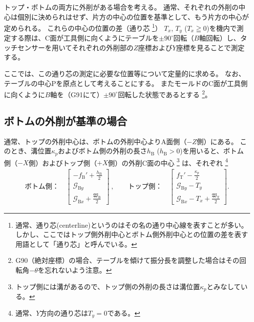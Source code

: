 \clearpage
トップ・ボトムの両方に外削がある場合を考える。
通常、それぞれの外削の中心は個別に決められはせず、片方の中心の位置を基準として、もう片方の中心が定められる。
これらの中心の位置の差（通り芯
\footnote{通常、通り芯(centerline)というのはその名の通り中心線を表すことが多い。
しかし、ここではトップ側外削中心とボトム側外削中心との位置の差を表す用語として「通り芯」と呼んでいる。}）
$T_x$, $T_y$ ($T_x \geqq 0$)を機内で測定する際は、C面が工具側に向くようにテーブルを$\pm90^\circ$回転（$B$軸回転）し、タッチセンサーを用いてそれぞれの外削部の$Z$座標および$Y$座標を見ることで測定する。

ここでは、この通り芯の測定に必要な位置等について定量的に求める。
なお、テーブルの中心Pを原点として考えることにする。
またモールドのC面が工具側に向くように$B$軸を（G91にて）$\pm90^\circ$回転した状態であるとする
\footnote{G90（絶対座標）の場合、テーブルを傾けて振分長を調整した場合はその回転角$-\theta$を忘れないよう注意。}。



\subsection{ボトムの外削が基準の場合}
通常、トップの外削中心は、ボトムの外削中心よりA面側（$-Z$側）にある。
このとき、溝位置$\kappa_p$およびボトム側の外削の長さ$h_\mathrm B$ ($h_\mathrm B > 0$)を用いると、ボトム側（$-X$側）およびトップ側（$+X$側）の外削C面の中心
\footnote{トップ側には溝があるので、トップ側の外削の長さは溝位置$\kappa_p$とみなしている。}
は、それぞれ
\footnote{通常、$Y$方向の通り芯は$T_y=0$である。}
\begin{align*}
  \text{ボトム側：}\quad
  \left[
    \begin{array}{c}
      \displaystyle -f_\mathrm B'+\frac{h_\mathrm B}2\\[5pt]
      \mathcal G_{\mathrm By}\\[3pt]
      \displaystyle \mathcal G_{\mathrm Bx}+\frac{\mathfrak W_\mathrm B}2
    \end{array}
    \right]~, \qquad
  \text{トップ側：}\quad
  \left[
    \begin{array}{c}
      \displaystyle f_\mathrm T'-\frac{\kappa_p}2\\[5pt]
      \mathcal G_{\mathrm By}-T_y\\[3pt]
      \displaystyle \mathcal G_{\mathrm Bx}-T_x+\frac{\mathfrak W_\mathrm T}2
    \end{array}
  \right].
\end{align*}



